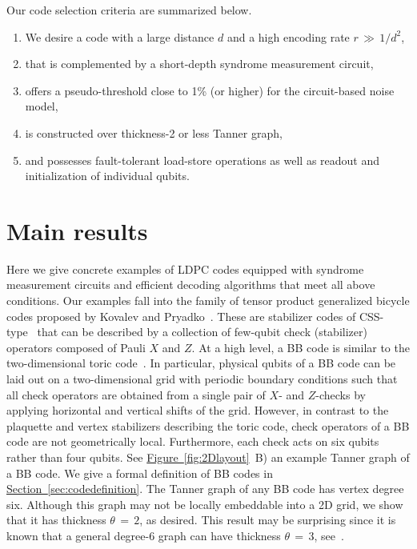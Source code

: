 \documentclass{article}
\renewcommand{\sec}[1]{\hyperref[sec:#1]{Section~\ref*{sec:#1}}}
\newcommand{\fig}[1]{\hyperref[fig:#1]{Figure~\ref*{fig:#1}}}
\newcommand{\edit}[1]{{\color{black}{#1}}}
\begin{document}
Our code selection criteria are summarized below.
\begin{enumerate}
\item We desire a code with a large distance $d$ and
a high encoding rate $r\,{\gg}\, 1/d^2$, 
\item that is complemented by a short-depth syndrome measurement circuit, 
\item offers a pseudo-threshold close to 1\% (or higher) for the circuit-based noise model,
\item is constructed over thickness-2 or less Tanner graph,
\item and possesses fault-tolerant load-store operations as well as readout and initialization of individual qubits. 
\end{enumerate}





\section{Main results}
\label{sec:results}


Here we give concrete examples of LDPC codes equipped with syndrome
measurement circuits and efficient decoding algorithms that 
meet all above conditions.
Our examples fall into the family of  tensor product generalized bicycle codes
proposed by Kovalev and  Pryadko~\cite{kovalev2013quantum}.
\edit{We named our codes Bivariate Bicycle (BB) since they are based on bivariate polynomials, as detailed below.}
These are stabilizer codes of CSS-type~\cite{steane1996multiple,calderbank1996good} 
that can be described by a collection of few-qubit check (stabilizer) operators
composed of Pauli $X$ and $Z$.
At a high level, a BB code is similar to the two-dimensional toric code~\cite{2003faulkitaevt}.
In particular, physical qubits of a BB code can be laid out on a two-dimensional  grid
with periodic boundary conditions such that all check operators are obtained from a single pair of $X$- and $Z$-checks  by applying horizontal and vertical shifts of the grid. However, in contrast to the plaquette and vertex stabilizers
describing the toric code, check operators of a BB code are not geometrically local.
Furthermore, each check acts on six qubits rather than four qubits.  See \fig{2Dlayout}~B) an example Tanner graph of a BB code.
We give a formal definition of BB codes in \sec{codedefinition}.
The Tanner graph of any BB code has vertex degree six. 
Although this graph  may not be locally embeddable into a 2D grid, we show that it has thickness $\theta\,{=}\,2$, as desired. 
This result may be surprising since it is known that 
a general degree-$6$ graph can have thickness $\theta \,{=}\, 3$, see~\cite{mutzel1998thickness}.
\end{document}
